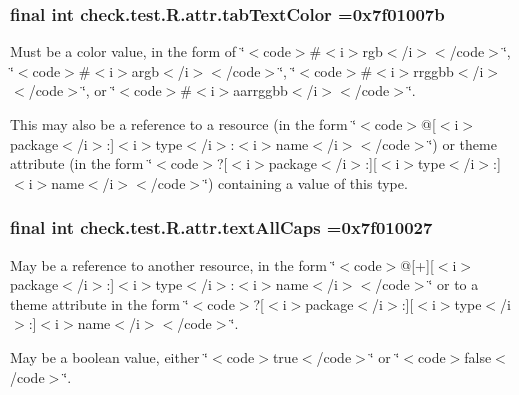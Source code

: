\subsubsection[{tab\+Text\+Color}]{\setlength{\rightskip}{0pt plus 5cm}final int check.\+test.\+R.\+attr.\+tab\+Text\+Color =0x7f01007b\hspace{0.3cm}{\ttfamily [static]}}\label{classcheck_1_1test_1_1_r_1_1attr_a5429daadf498e6cbc4dec50f3c1251e3}
Must be a color value, in the form of \char`\"{}$<$code$>$\#$<$i$>$rgb$<$/i$>$$<$/code$>$\char`\"{}, \char`\"{}$<$code$>$\#$<$i$>$argb$<$/i$>$$<$/code$>$\char`\"{}, \char`\"{}$<$code$>$\#$<$i$>$rrggbb$<$/i$>$$<$/code$>$\char`\"{}, or \char`\"{}$<$code$>$\#$<$i$>$aarrggbb$<$/i$>$$<$/code$>$\char`\"{}. 

This may also be a reference to a resource (in the form \char`\"{}$<$code$>$@\mbox{[}$<$i$>$package$<$/i$>$\+:\mbox{]}$<$i$>$type$<$/i$>$\+:$<$i$>$name$<$/i$>$$<$/code$>$\char`\"{}) or theme attribute (in the form \char`\"{}$<$code$>$?\mbox{[}$<$i$>$package$<$/i$>$\+:\mbox{]}\mbox{[}$<$i$>$type$<$/i$>$\+:\mbox{]}$<$i$>$name$<$/i$>$$<$/code$>$\char`\"{}) containing a value of this type. \hypertarget{classcheck_1_1test_1_1_r_1_1attr_a09d1fb38439d083ce88110c7038a7949}{}
\subsubsection[{text\+All\+Caps}]{\setlength{\rightskip}{0pt plus 5cm}final int check.\+test.\+R.\+attr.\+text\+All\+Caps =0x7f010027\hspace{0.3cm}{\ttfamily [static]}}\label{classcheck_1_1test_1_1_r_1_1attr_a09d1fb38439d083ce88110c7038a7949}
May be a reference to another resource, in the form \char`\"{}$<$code$>$@\mbox{[}+\mbox{]}\mbox{[}$<$i$>$package$<$/i$>$\+:\mbox{]}$<$i$>$type$<$/i$>$\+:$<$i$>$name$<$/i$>$$<$/code$>$\char`\"{} or to a theme attribute in the form \char`\"{}$<$code$>$?\mbox{[}$<$i$>$package$<$/i$>$\+:\mbox{]}\mbox{[}$<$i$>$type$<$/i$>$\+:\mbox{]}$<$i$>$name$<$/i$>$$<$/code$>$\char`\"{}. 

May be a boolean value, either \char`\"{}$<$code$>$true$<$/code$>$\char`\"{} or \char`\"{}$<$code$>$false$<$/code$>$\char`\"{}. \hypertarget{classcheck_1_1test_1_1_r_1_1attr_a378cf97243180991de45fbf2a470b74f}{}
